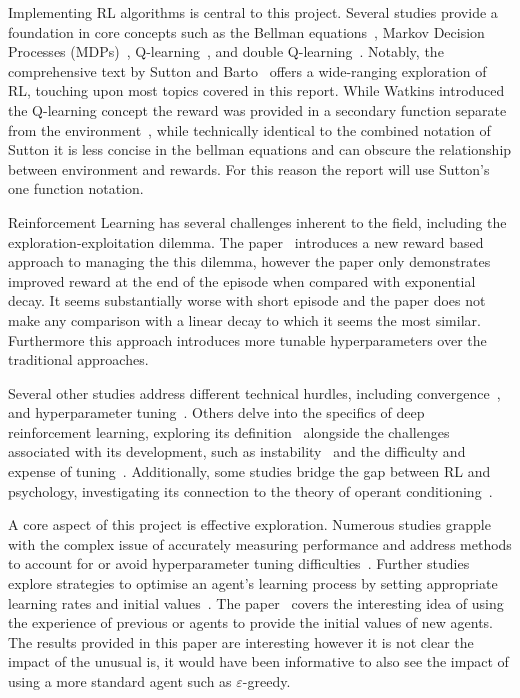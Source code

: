 \documentclass[]{final_report}
\begin{document}
Implementing RL algorithms is central to this project. Several studies provide a foundation in core concepts such as the Bellman equations~\cite{bellman1957}, Markov Decision Processes (MDPs)~\cite{meyn2012markov,sutton2018reinforcement}, Q-learning~\cite{watkins1992q}, and double Q-learning~\cite{doubleQLearning}. Notably, the comprehensive text  by Sutton and Barto~\cite{sutton2018reinforcement} offers a wide-ranging exploration of RL, touching upon most topics covered in this report. While Watkins introduced the Q-learning concept the reward was provided in a secondary function separate from the environment~\cite{watkins1992q}, while technically identical to the combined notation of Sutton it is less concise in the bellman equations and can obscure the relationship between environment and rewards. For this reason the report will use Sutton's one function notation.

Reinforcement Learning has several challenges inherent to the field, including the exploration-exploitation dilemma. The  paper~\cite{rewardEpsilonDecay} introduces a new reward based approach to managing the this dilemma, however the paper only demonstrates improved reward at the end of the episode when compared with exponential decay. It seems substantially worse with short episode and the paper does not make any comparison with a linear decay to which it seems the most similar. Furthermore this approach introduces more tunable hyperparameters over the traditional approaches.

Several other studies address different technical hurdles, including convergence~\cite{watkins1992q, QlearningConvergance}, and hyperparameter tuning~\cite{deepRLChallanges, searchStrategies}. Others delve into the specifics of deep reinforcement learning, exploring its definition~\cite{deepRLOverview} alongside the challenges associated with its development, such as instability~\cite{deepOnVsOffPolicy,sutton2018reinforcement} and the difficulty and expense of tuning~\cite{deepRLChallanges, DeepRLCost}. Additionally, some studies bridge the gap between RL and psychology, investigating its connection to the theory of operant conditioning~\cite{shteingart2014reinforcement,staddon2003operant}.

A core aspect of this project is effective exploration. Numerous studies grapple with the complex issue of accurately measuring performance and address methods to account for or avoid hyperparameter tuning difficulties~\cite{assessingDeepRL, evaluatingRL, parameterFreeExploration}. Further studies explore strategies to optimise an agent's learning process by setting appropriate learning rates and initial values~\cite{even2003learning, deathTransfer,decayingLearningRates}. The  paper~\cite{deathTransfer} covers the interesting idea of using the experience of previous or  agents to provide the initial values of new agents. The results provided in this paper are interesting however it is not clear the impact of the unusual  is, it would have been informative to also see the impact of using a more standard agent such as $\varepsilon$-greedy.
\end{document}
